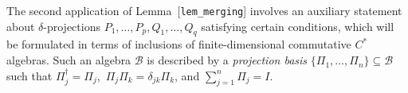 \hypertarget{def:projection-basis}{}%
\begin{definition}\label{def:projection-basis}
The second application of Lemma~\textup{[\texttt{lem\_merging}]} involves an auxiliary statement about $\delta$-projections $P_1,\dots,P_p,Q_1,\dots,Q_q$ satisfying certain conditions, which will be formulated in terms of inclusions of finite-dimensional commutative $C^*$ algebras. Such an algebra $\mathcal{B}$ is described by a \emph{projection basis} $\{\Pi_1,\dots,\Pi_n\}\subseteq\mathcal{B}$ such that $\Pi_j^\dagger=\Pi_j$,\, $\Pi_j\Pi_k=\delta_{jk}\Pi_k$, and $\sum_{j=1}^{n}\Pi_j=I$.
\end{definition}
